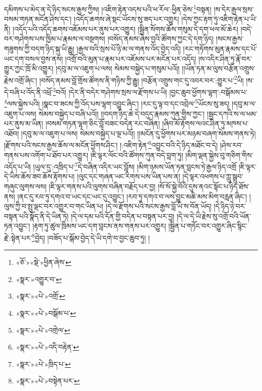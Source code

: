 དམིགས་པ་མེད་ན་དེ་ཉིད་སངས་རྒྱས་ཀྱིས། །འཇིག་རྟེན་འདས་པའི་ཕ་རོལ་:ཕྱིན་ཅེས་\footnote{«ཅོ་»«སྡེ་»ཕྱིན་ཞེས་}བསྟན། །ས་དེར་རྒྱལ་སྲས་བསམ་གཏན་མངོན་ཤེས་དང་། །འདོད་ཆགས་ཞེ་སྡང་ཡོངས་སུ་ཟད་པར་འགྱུར། །དེས་ཀྱང་རྟག་ཏུ་འཇིག་རྟེན་པ་ཡི་ནི། །འདོད་པའི་འདོད་ཆགས་འཇོམས་པར་ནུས་པར་འགྱུར། །སྦྱིན་སོགས་ཆོས་གསུམ་དེ་དག་ཕལ་མོ་ཆེར། །བདེ་བར་གཤེགས་པས་ཁྱིམ་པ་རྣམས་ལ་བསྔགས། །བསོད་ནམས་ཞེས་བྱའི་ཚོགས་ཀྱང་དེ་དག་ཉིད། །སངས་རྒྱས་གཟུགས་ཀྱི་བདག་ཉིད་སྐུ་ཡི་རྒྱུ། །རྒྱལ་བའི་སྲས་པོ་ཉི་མ་ལ་གནས་འོད་བྱེད་འདི། །རང་གཏོགས་མུན་རྣམས་དང་པོ་ཡང་དག་བསལ་བྱས་ནས། །འགྲོ་བའི་མུན་པ་རྣམ་པར་འཇོམས་པར་མངོན་པར་འདོད། །ས་འདིར་ཤིན་ཏུ་རྣོ་བར་གྱུར་ཀྱང་ཁྲོ་མི་འགྱུར། །དབུ་མ་ལ་འཇུག་པ་ལས། སེམས་བསྐྱེད་པ་གསུམ་པའོ།། །།ཡོན་ཏན་མ་ལུས་བརྩོན་འགྲུས་རྗེས་འགྲོ་ཞིང་། །བསོད་ནམས་བློ་གྲོས་ཚོགས་ནི་གཉིས་ཀྱི་རྒྱུ། །བརྩོན་འགྲུས་གང་དུ་འབར་བར་:གྱུར་པ་\footnote{«སྣར་»འགྱུར་བ་}ཡི། །ས་དེ་བཞི་པ་འོད་ནི་འཕྲོ་\footnote{«སྣར་»«པེ་»འགྲོ་}བའོ། །དེར་ནི་བདེར་གཤེགས་སྲས་ལ་རྫོགས་པ་ཡི། །བྱང་ཆུབ་ཕྱོགས་ལྷག་:བསྒོམས་པ་\footnote{«སྣར་»«པེ་»བསྒོམ་པ་}ལས་སྐྱེས་པའི། །སྣང་བ་ཟངས་ཀྱི་འོད་པས་ལྷག་འབྱུང་ཞིང་། །རང་དུ་ལྟ་བ་དང་འབྲེལ་\footnote{«སྣར་»«པེ་»འགྲེལ་}ཡོངས་སུ་ཟད། །དབུ་མ་ལ་འཇུག་པ་ལས། སེམས་བསྐྱེད་པ་བཞི་པའོ།། །།བདག་ཉིད་ཆེ་དེ་བདུད་རྣམས་ཀུན་གྱིས་ཀྱང་། །སྦྱང་དཀའི་ས་ལ་ཕམ་པར་ནུས་མ་ཡིན། །བསམ་གཏན་ལྷག་ཅིང་བློ་བཟང་བདེན་རང་བཞིན། །ཞིབ་མོ་རྟོགས་ལའང་ཤིན་ཏུ་མཁས་པ་འཐོབ། །དབུ་མ་ལ་འཇུག་པ་ལས། སེམས་བསྐྱེད་པ་ལྔ་པའོ།། །།མངོན་དུ་ཕྱོགས་པར་མཉམ་བཞག་སེམས་གནས་ཏེ། །རྫོགས་པའི་སངས་རྒྱས་ཆོས་ལ་མངོན་ཕྱོགས་ཤིང་། །:འཇིག་རྟེན་\footnote{«སྣར་»«པེ་»འདི་བརྟེན་}འབྱུང་བའི་དེ་ཉིད་མཐོང་བ་དེ། །ཤེས་རབ་གནས་པས་འགོག་པ་ཐོབ་པར་འགྱུར། །ཇི་ལྟར་ལོང་བའི་ཚོགས་ཀུན་བདེ་བླག་ཏུ། །མིག་ལྡན་སྐྱེས་བུ་གཅིག་གིས་འདོད་པ་ཡི། །ཡུལ་དུ་:འཁྲིད་པ་\footnote{«སྣར་»«པེ་»ཁྲིད་པ་}དེ་བཞིན་འདིར་ཡང་བློས། །མིག་ཉམས་ཡོན་ཏན་བླངས་ཏེ་རྒྱལ་ཉིད་འགྲོ །ཇི་ལྟར་དེ་ཡིས་ཆོས་ཟབ་ཆོས་རྟོགས་པ། །ལུང་དང་གཞན་ཡང་རིགས་པས་ཡིན་པས་ན། །དེ་ལྟར་འཕགས་པ་ཀླུ་སྒྲུབ་གཞུང་ལུགས་ལས། །ཇི་ལྟར་གནས་པའི་ལུགས་བཞིན་བརྗོད་པར་བྱ། །སོ་སོ་སྐྱེ་བོའི་དུས་ནའང་སྟོང་པ་ཉིད་ཐོས་ནས། །ནང་དུ་རབ་ཏུ་དགའ་བ་ཡང་དང་ཡང་དུ་འབྱུང་། །རབ་ཏུ་དགའ་བ་ལས་བྱུང་མཆི་མས་མིག་བརླན་ཞིང་། །ལུས་ཀྱི་བ་སྤུ་ལྡང་བར་འགྱུར་བ་གང་ཡིན་པ། །དེ་ལ་རྫོགས་པའི་སངས་རྒྱས་བློ་ཡི་ས་བོན་ཡོད། །དེ་ཉིད་ཉེ་བར་བསྟན་པའི་སྣོད་ནི་དེ་ཡིན་ཏེ། །དེ་ལ་དམ་པའི་དོན་གྱི་བདེན་པ་བསྟན་པར་བྱ། །དེ་ལ་དེ་ཡི་རྗེས་སུ་འགྲོ་བའི་ཡོན་ཏན་འབྱུང་། །རྟག་ཏུ་ཚུལ་ཁྲིམས་ཡང་དག་བླངས་ནས་གནས་པར་འགྱུར། །སྦྱིན་པ་གཏོང་བར་འགྱུར་ཞིང་སྙིང་རྗེ་:སྟེན་པར་\footnote{«སྣར་»«པེ་»བསྟེན་པར་}བྱེད། །བཟོད་པ་སྒོམ་བྱེད་དེ་ཡི་དགེ་བ་བྱང་ཆུབ་ཏུ། །
